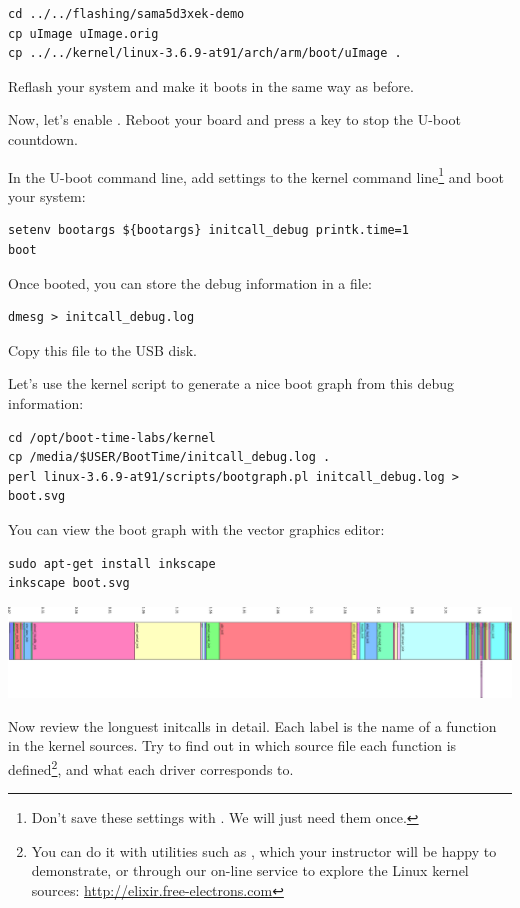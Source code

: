 \begin{verbatim}
cd ../../flashing/sama5d3xek-demo
cp uImage uImage.orig
cp ../../kernel/linux-3.6.9-at91/arch/arm/boot/uImage .
\end{verbatim}

Reflash your system and make it boots in the same way as before.

Now, let's enable . Reboot your board and press
a key to stop the U-boot countdown.

In the U-boot command line, add settings to the kernel command
line\footnote{Don't save these settings with . We
will just need them once.}
and boot your system:
\begin{verbatim}
setenv bootargs ${bootargs} initcall_debug printk.time=1
boot
\end{verbatim}

Once booted, you can store the debug information in a file:

\begin{verbatim}
dmesg > initcall_debug.log
\end{verbatim}

Copy this file to the USB disk.

Let's use the kernel script to generate a nice boot graph
from this debug information:

\begin{verbatim}
cd /opt/boot-time-labs/kernel
cp /media/$USER/BootTime/initcall_debug.log .
perl linux-3.6.9-at91/scripts/bootgraph.pl initcall_debug.log > boot.svg
\end{verbatim}

You can view the boot graph with the  vector graphics
editor:

\begin{verbatim}
sudo apt-get install inkscape
inkscape boot.svg
\end{verbatim}

\begin{center}
\includegraphics[width=\textwidth]{labs/boottime-kernel/boot.png}
\end{center}

Now review the longuest initcalls in detail. Each label is the name of
a function in the kernel sources. Try to find out in which source file
each function is defined\footnote{You can do it with utilities such as
, which your instructor will be happy to demonstrate,
or through our on-line service to explore the Linux kernel sources:
\url{http://elixir.free-electrons.com}}, and what each driver corresponds
to.

